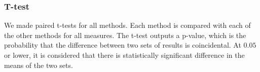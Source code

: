 \subsubsection{T-test}\label{sec:ttest}
We made paired t-tests for all methods\cite{ttest}. Each method is compared with each of the other methods for all measures. The t-test outputs a p-value, which is the probability that the difference between two sets of results is coincidental. At $0.05$ or lower, it is considered that there is statistically significant difference in the means of the two sets.
